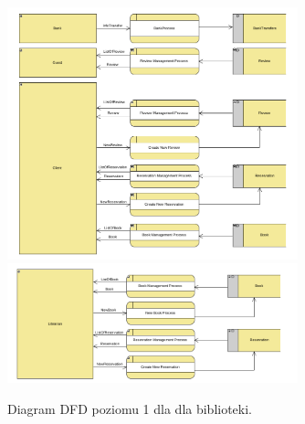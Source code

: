 \documentclass[12pt]{article}
\begin{document}
\begin{figure}[!h]
    \centering
    \includegraphics[width=0.75\textwidth]{Schemat2}
    \includegraphics[width=0.75\textwidth]{Schemat3}
    \caption{Diagram DFD poziomu 1 dla dla biblioteki.}
\end{figure}
\end{document}
